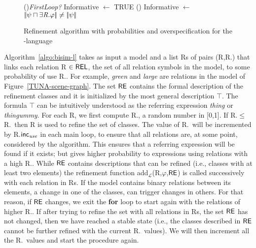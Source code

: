 \begin{figure}[!t]
\begin{algorithm}[H]
\If(){\em FirstLoop?}{
    Informative $\leftarrow$ TRUE }
\lElse() {Informative $\leftarrow$ $|\!|\psi \sqcap \exists \mbox{\em R}.\varphi|\!| \neq |\!|\psi|\!|$} 
\end{algorithm}
\vspace*{-.5cm}\caption{Refinement algorithm with probabilities and overspecification for the \el-language}\label{fig:algo3}

\end{figure}

Algorithm~\ref{algo:bisim-l} takes as input a model and a list Rs of pairs (R,R.\puse) that links each relation R $\in \textsf{REL}$, the set of all relation symbols in the model,  to some probability of use R.\puse. For example, \emph{green} and \emph{large} are relations in the model of Figure~\ref{TUNA-scene-graph}.  
%
The set $\textsf{RE}$ contains the formal description of the refinement classes and it is initialized by the most general description $\top$. The formula $\top$ can be intuitively understood as the referring expression \emph{thing} or \emph{thingummy}.  
For each R, we first compute R.\randomuse, a random number in [0,1].  If R.\randomuse $\le$ R.\puse\ then R is used to refine the set of classes.  The value of R.\puse\ will be incremented by R.$\textsf{inc}_\emph{use}$ in each main loop, to ensure that all relations are, at some point, considered by the algorithm.  This ensures that a referring expression will be found if it exists; but gives higher probability to expressions using relations with a high R.\puse. 
While $\textsf{RE}$ contains descriptions that can be refined (i.e., classes with at least two elements) the refinement function add$_\mathcal{L}$(R,$\varphi$,$\textsf{RE}$) is called successively with each relation in Rs. If the model contains binary relations between its elements, a change in one of the classes, can trigger changes in others. For that reason, if $\textsf{RE}$ changes, we exit the \textbf{for} loop to start again with the relations of higher R.\puse. If after trying to refine the set with all relations in Rs, the set $\textsf{RE}$ has not changed, then we have reached a stable state (i.e., the classes described in $\textsf{RE}$ cannot be further refined with the current R.\puse\ values). We will then increment all the R.\puse\ values and start the procedure again. 

